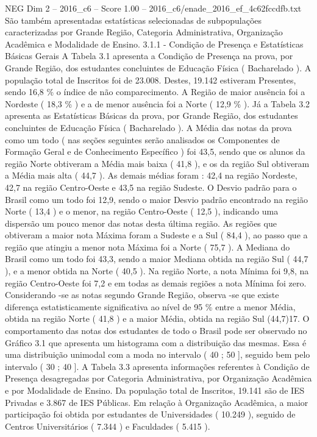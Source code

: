 \begin{textsample}{NEG Dim 2 – 2016\_c6 – Score 1.00 – 2016\_c6/enade\_2016\_ef\_4c62fccdfb.txt}
São também apresentadas estatísticas selecionadas de subpopulações caracterizadas por Grande Região, Categoria Administrativa, Organização Acadêmica e Modalidade de Ensino. 3.1.1 - Condição de Presença e Estatísticas Básicas Gerais A Tabela 3.1 apresenta a Condição de Presença na prova, por Grande Região, dos estudantes concluintes de Educação Física ( Bacharelado ).
A população total de Inscritos foi de 23.008.
Destes, 19.142 estiveram Presentes, sendo 16,8 \% o índice de não comparecimento.
A Região de maior ausência foi a Nordeste ( 18,3 \% ) e a de menor ausência foi a Norte ( 12,9 \% ).
Já a Tabela 3.2 apresenta as Estatísticas Básicas da prova, por Grande Região, dos estudantes concluintes de Educação Física ( Bacharelado ).
A Média das notas da prova como um todo ( nas seções seguintes serão analisados os Componentes de Formação Geral e de Conhecimento Específico ) foi 43,5, sendo que os alunos da região Norte obtiveram a Média mais baixa ( 41,8 ), e os da região Sul obtiveram a Média mais alta ( 44,7 ).
As demais médias foram : 42,4 na região Nordeste, 42,7 na região Centro-Oeste e 43,5 na região Sudeste.
O Desvio padrão para o Brasil como um todo foi 12,9, sendo o maior Desvio padrão encontrado na região Norte ( 13,4 ) e o menor, na região Centro-Oeste ( 12,5 ), indicando uma dispersão um pouco menor das notas desta última região.
As regiões que obtiveram a maior nota Máxima foram a Sudeste e a Sul ( 84,4 ), ao passo que a região que atingiu a menor nota Máxima foi a Norte ( 75,7 ).
A Mediana do Brasil como um todo foi 43,3, sendo a maior Mediana obtida na região Sul ( 44,7 ), e a menor obtida na Norte ( 40,5 ).
Na região Norte, a nota Mínima foi 9,8, na região Centro-Oeste foi 7,2 e em todas as demais regiões a nota Mínima foi zero.
Considerando -se as notas segundo Grande Região, observa -se que existe diferença estatisticamente significativa ao nível de 95 \% entre a menor Média, obtida na região Norte ( 41,8 ) e a maior Média, obtida na região Sul (44,7)17.
O comportamento das notas dos estudantes de todo o Brasil pode ser observado no Gráfico 3.1 que apresenta um histograma com a distribuição das mesmas.
Essa é uma distribuição unimodal com a moda no intervalo ( 40 ; 50 ], seguido bem pelo intervalo ( 30 ; 40 ].
A Tabela 3.3 apresenta informações referentes à Condição de Presença desagregadas por Categoria Administrativa, por Organização Acadêmica e por Modalidade de Ensino.
Da população total de Inscritos, 19.141 são de IES Privadas e 3.867 de IES Públicas.
Em relação à Organização Acadêmica, a maior participação foi obtida por estudantes de Universidades ( 10.249 ), seguido de Centros Universitários ( 7.344 ) e Faculdades ( 5.415 ).

\end{textsample}
